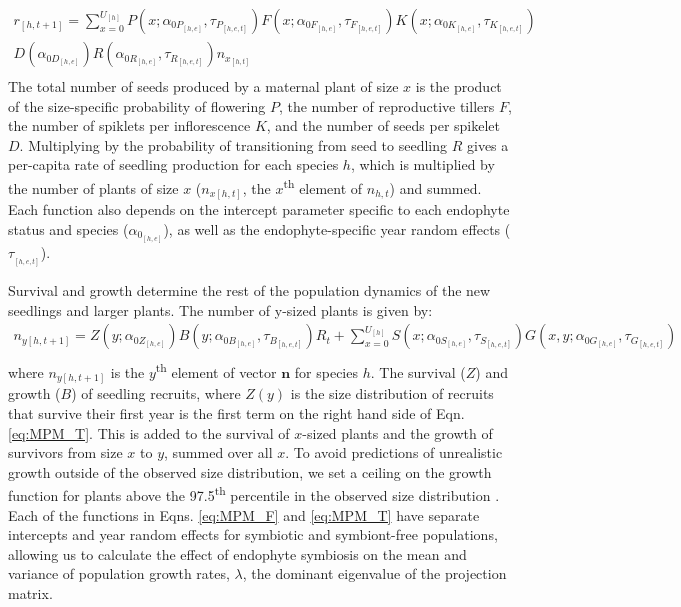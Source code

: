 \documentclass[12pt]{article}
\begin{document}
\begin{equation} 
	\label{eq:MPM_F}
	\begin{aligned}
		r_{[h,t+1]} = \sum_{x=0}^{U_{[h]}} P(x;\alpha_{0P_{[h,e]}}, \tau_{P_{[h,e,t]}})F(x;\alpha_{0F_{[h,e]}}, \tau_{F_{[h,e,t]}})K(x;\alpha_{0K_{[h,e]}}, \tau_{K_{[h,e,t]}}) \\
		D(\alpha_{0D_{[h,e]}})R(\alpha_{0R_{[h,e]}}, \tau_{R_{[h,e,t]}}) n_{x_{[h,t]}}\\
	\end{aligned}
\end{equation}
The total number of seeds produced by a maternal plant of size $x$ is the product of the size-specific probability of flowering $P$, the number of reproductive tillers $F$, the number of spiklets per inflorescence $K$, and the number of seeds per spikelet $D$. 
Multiplying by the probability of transitioning from seed to seedling $R$ gives a per-capita rate of seedling production for each species $h$, which is multiplied by the number of plants of size $x$ ($n_{x[h,t]}$, the $x$\textsuperscript{th} element of $n_{h,t}$) and summed.  
Each function also depends on the intercept parameter specific to each endophyte status and species ($\alpha_{0_{[h,e]}}$), as well as the endophyte-specific year random effects  ($\tau_{_{[h,e,t]}}$). 

Survival and growth determine the rest of the population dynamics of the new seedlings and larger plants. 
The number of y-sized plants is given by:
\begin{equation} 
	\label{eq:MPM_T}
	\begin{aligned}
		n_{y{[h,t+1]}} = Z(y;\alpha_{0Z_{[h,e]}})B(y;\alpha_{0B_{[h,e]}},\tau_{B_{[h,e,t]}})R_{t}  + 
		\sum_{x=0}^{U_{[h]}} S(x;\alpha_{0S_{[h,e]}},\tau_{S_{[h,e,t]}})G(x,y;\alpha_{0G_{[h,e]}},\tau_{G_{[h,e,t]}})\\
	\end{aligned}
\end{equation}
where $n_{y{[h,t+1]}}$ is the $y$\textsuperscript{th} element of vector $\textbf{n}$ for species $h$.
The survival ($Z$) and growth ($B$) of seedling recruits, where $Z(y)$ is the size distribution of recruits that survive their first year is the first term on the right hand side of Eqn. \ref{eq:MPM_T}. 
This is added to the survival of $x$-sized plants and the growth of survivors from size $x$ to $y$, summed over all $x$. 
To avoid predictions of unrealistic growth outside of the observed size distribution, we set a ceiling on the growth function for plants above the 97.5\textsuperscript{th} percentile in the observed size distribution \cite{williams2012avoiding}.
Each of the functions in Eqns. \ref{eq:MPM_F} and \ref{eq:MPM_T} have separate intercepts and year random effects for symbiotic and symbiont-free populations, allowing us to calculate the effect of endophyte symbiosis on the mean and variance of population growth rates, $\lambda$, the dominant eigenvalue of the projection matrix.
\end{document}

